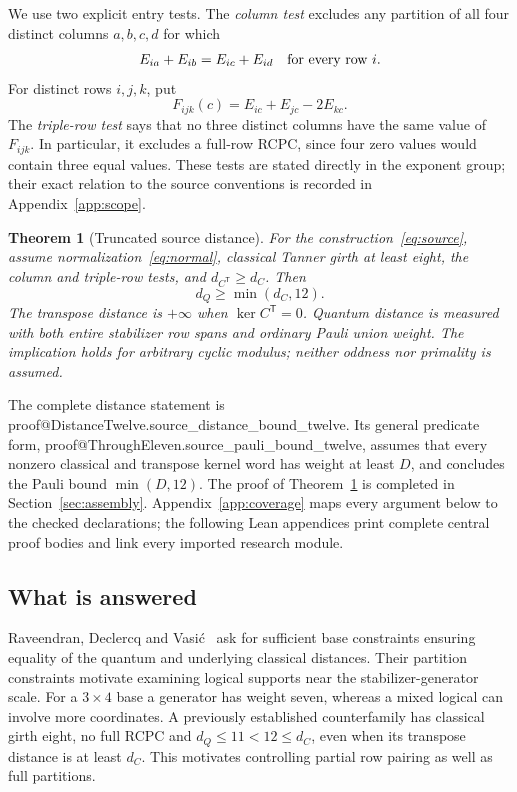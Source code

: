\documentclass[11pt]{article}
\makeatletter
\newtheorem{theorem}{Theorem}[section]
\theoremstyle{definition}\newtheorem{definition}[theorem]{Definition}
\newcommand{\lean}[2]{\csname proof@#1.#2\endcsname}
\makeatother
\begin{document}
We use two explicit entry tests. The \emph{column test} excludes any partition
of all four distinct columns $a,b,c,d$ for which
\begin{equation}\label{eq:column}
 E_{ia}+E_{ib}=E_{ic}+E_{id}\quad\hbox{for every row }i.
\end{equation}
For distinct rows $i,j,k$, put
\begin{equation}\label{eq:rowform}
 F_{ijk}(c)=E_{ic}+E_{jc}-2E_{kc}.
\end{equation}
The \emph{triple-row test} says that no three distinct columns have the same
value of $F_{ijk}$. In particular, it excludes a full-row RCPC, since four
zero values would contain three equal values. These tests are stated directly
in the exponent group; their exact relation to the source conventions is
recorded in Appendix~\ref{app:scope}.

\begin{theorem}[Truncated source distance]\label{thm:main}
For the construction~\eqref{eq:source}, assume normalization~\eqref{eq:normal},
classical Tanner girth at least eight, the column and triple-row tests, and
$d_{C^{\mathsf T}}\geq d_C$. Then
\begin{equation}\label{eq:main}
                         d_Q\geq\min(d_C,12).
\end{equation}
The transpose distance is $+\infty$ when $\ker C^{\mathsf T}=0$.
Quantum distance is measured with both entire stabilizer row spans and
ordinary Pauli union weight. The implication holds for arbitrary cyclic
modulus; neither oddness nor primality is assumed.
\end{theorem}

The complete distance statement is
\lean{DistanceTwelve}{source_distance_bound_twelve}.
Its general predicate form,
\lean{ThroughEleven}{source_pauli_bound_twelve}, assumes that every nonzero
classical and transpose kernel word has weight at least $D$, and concludes
the Pauli bound $\min(D,12)$. The proof of Theorem~\ref{thm:main} is completed
in Section~\ref{sec:assembly}. Appendix~\ref{app:coverage} maps every argument
below to the checked declarations; the following Lean appendices print
complete central proof bodies and link every imported research module.

\subsection{What is answered}
Raveendran, Declercq and Vasi\'c~\cite[Eq.~(9), Definitions 2--5 and
Section VI]{RDV} ask for sufficient base constraints ensuring equality of the
quantum and underlying classical distances. Their partition constraints
motivate examining logical supports near the stabilizer-generator scale.
For a $3\times4$ base a generator has weight seven, whereas a mixed logical
can involve more coordinates. A previously established counterfamily
\cite{Counterfamily} has classical girth eight, no full RCPC and
$d_Q\leq11<12\leq d_C$, even when its transpose distance is at least $d_C$.
This motivates controlling partial row pairing as well as full partitions.
\end{document}
